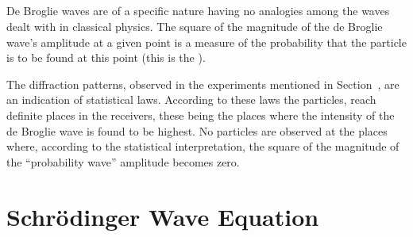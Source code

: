 \subsection{}\label{38.1.9} De Broglie waves are of a specific nature having no analogies among the waves dealt with in classical physics. The square of the magnitude of the de Broglie wave's amplitude at a given point is a measure of the probability that the particle is to be found at this point (this is the ). 

The diffraction patterns, observed in the experiments mentioned in Section~, are an indication of statistical laws. According to these laws the particles, reach definite places in the receivers, these being the places where the intensity  of the de Broglie wave is found to be
highest. No particles are observed at the places where, according to the statistical interpretation, the square of the magnitude of the ``probability wave'' amplitude becomes zero.

\section{Schr\"odinger Wave Equation}
\label{sec-38.2} 


